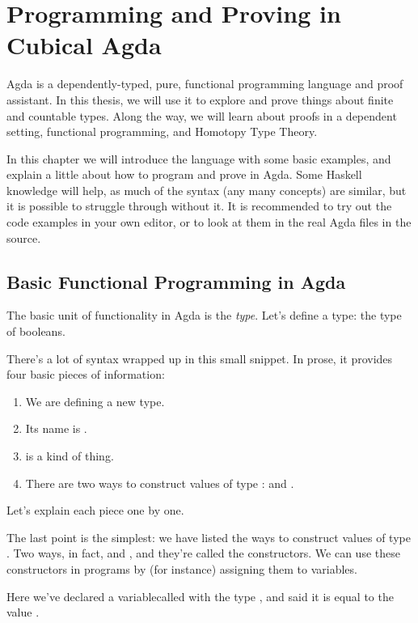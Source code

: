 \chapter{Programming and Proving in Cubical Agda}
Agda \cite{norellDependentlyTypedProgramming2008} is a dependently-typed, pure,
functional programming language and proof assistant.
In this thesis, we will use it to explore and prove things about finite and
countable types.
Along the way, we will learn about proofs in a dependent setting, functional
programming, and Homotopy Type Theory.

In this chapter we will introduce the language with some basic examples, and
explain a little about how to program and prove in Agda.
Some Haskell knowledge will help, as much of the syntax (any many concepts) are
similar, but it is possible to struggle through without it.
It is recommended to try out the code examples in your own editor, or to look at
them in the real Agda files in the source.
\section{Basic Functional Programming in Agda}
The basic unit of functionality in Agda is the \emph{type}.
Let's define a type: the type of booleans.
\begin{agdalisting} \label{bool-def}
\end{agdalisting}
There's a lot of syntax wrapped up in this small snippet.
In prose, it provides four basic pieces of information:
\begin{enumerate}
  \item We are defining a new  type.
  \item Its name is .
  \item {} is a  kind of thing.
  \item There are two ways to construct values of type :
     and .
\end{enumerate}
Let's explain each piece one by one.

The last point is the simplest: we have listed the ways to construct values of
type .
Two ways, in fact,  and
, and they're called the constructors.
We can use these constructors in programs by (for instance) assigning them to
variables.
\begin{agdalisting*}
\end{agdalisting*}
Here we've declared a variable\footnotemark called  with
the type , and said it is equal to the value
.

